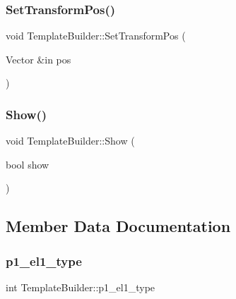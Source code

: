 \hypertarget{class_template_builder_abec2ea6ded5dc3bca9c5d6027986cc21}{}\label{class_template_builder_abec2ea6ded5dc3bca9c5d6027986cc21} 
\subsubsection{\texorpdfstring{Set\+Transform\+Pos()}{SetTransformPos()}}
{\footnotesize\ttfamily void Template\+Builder\+::\+Set\+Transform\+Pos (\begin{DoxyParamCaption}\item[{Vector \&in}]{pos }\end{DoxyParamCaption})}

\hypertarget{class_template_builder_a5857b6fad4674942cbc43812a381286a}{}\label{class_template_builder_a5857b6fad4674942cbc43812a381286a} 
\subsubsection{\texorpdfstring{Show()}{Show()}}
{\footnotesize\ttfamily void Template\+Builder\+::\+Show (\begin{DoxyParamCaption}\item[{bool}]{show }\end{DoxyParamCaption})}



\subsection{Member Data Documentation}
\hypertarget{class_template_builder_ae5a2033ac1a03e416a964d0a0c27ee5e}{}\label{class_template_builder_ae5a2033ac1a03e416a964d0a0c27ee5e} 
\subsubsection{\texorpdfstring{p1\+\_\+el1\+\_\+type}{p1\_el1\_type}}
{\footnotesize\ttfamily int Template\+Builder\+::p1\+\_\+el1\+\_\+type}

\hypertarget{class_template_builder_ab95c7b1a998d72515ab4ebe55c26c705}{}\label{class_template_builder_ab95c7b1a998d72515ab4ebe55c26c705} 

